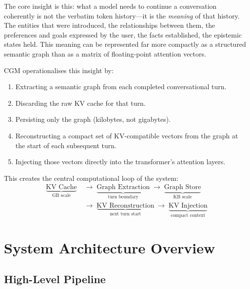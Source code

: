 \documentclass[11pt, a4paper, twoside]{article}
\theoremstyle{definition}
\newcommand{\CGM}{\textsc{CGM}\xspace}
\begin{document}
The core insight is this: what a model needs to continue a conversation coherently is
not the verbatim token history---it is the \textit{meaning} of that history. The
entities that were introduced, the relationships between them, the preferences and goals
expressed by the user, the facts established, the epistemic states held. This meaning
can be represented far more compactly as a structured semantic graph than as a matrix
of floating-point attention vectors.

\medskip

\CGM operationalises this insight by:
\begin{enumerate}[leftmargin=*]
  \item Extracting a semantic graph from each completed conversational turn.
  \item Discarding the raw KV cache for that turn.
  \item Persisting only the graph (kilobytes, not gigabytes).
  \item Reconstructing a compact set of KV-compatible vectors from the graph at
    the start of each subsequent turn.
  \item Injecting those vectors directly into the transformer's attention layers.
\end{enumerate}

This creates the central computational loop of the system:
\begin{align*}
\underbrace{\text{KV Cache}}_{\text{GB scale}}
&\;\longrightarrow\;
\underbrace{\text{Graph Extraction}}_{\text{turn boundary}}
\;\longrightarrow\;
\underbrace{\text{Graph Store}}_{\text{KB scale}}\\[4pt]
&\;\longrightarrow\;
\underbrace{\text{KV Reconstruction}}_{\text{next turn start}}
\;\longrightarrow\;
\underbrace{\text{KV Injection}}_{\text{compact context}}
\end{align*}

\section{System Architecture Overview}
\label{sec:architecture}

\subsection{High-Level Pipeline}
\end{document}
